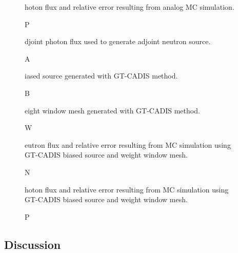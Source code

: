 \begin{figure} \label{fig:pflux}
  \caption Photon flux and relative error resulting from analog MC simulation.
\end{figure}

\begin{figure}\label{fig:adj_p_flux}
  \caption Adjoint photon flux used to generate adjoint neutron source.  
\end{figure}

\begin{figure} \label{fig:biased_src}
  \caption Biased source generated with GT-CADIS method.
\end{figure}

\begin{figure} \label{fig:wwinp}
  \caption Weight window mesh generated with GT-CADIS method.
\end{figure}

\begin{figure} \label{fig:gt_nflux}
  \caption Neutron flux and relative error resulting from MC simulation using
  GT-CADIS biased source and weight window mesh.
\end{figure}

\begin{figure} \label{fig:gt_pflux}
  \caption Photon flux and relative error resulting from MC simulation using
  GT-CADIS biased source and weight window mesh.
\end{figure}


\subsection{Discussion}

